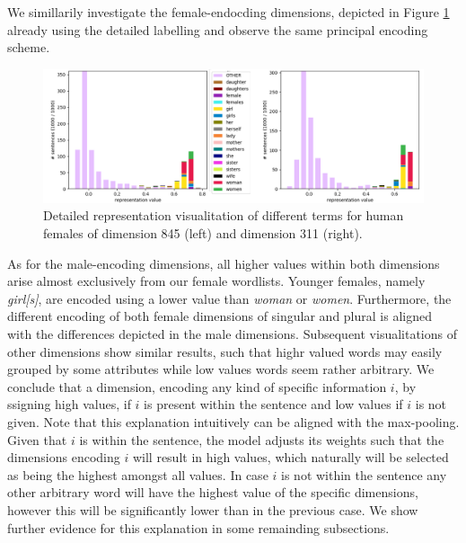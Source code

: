 \noindent
We simillarily investigate the female-endocding dimensions, depicted in Figure \ref{fig:mf_detailed_f} already using the detailed labelling and observe the same principal encoding scheme. 
\begin{figure}[tph!]
\centering
	\includegraphics[totalheight=5cm]{fig/mf_detailed_f.png}
	\caption{Detailed representation visualitation of different terms for human females of dimension 845 (left) and dimension 311 (right).}
	\label{fig:mf_detailed_f}
\end{figure}
As for the male-encoding dimensions, all higher values within both dimensions arise almost exclusively from our female wordlists. Younger females, namely \textit{girl[s]}, are encoded using a lower value than \textit{woman} or \textit{women}. Furthermore, the different encoding of both female dimensions of singular and plural is aligned with the differences depicted in the male dimensions. Subsequent visualitations of other dimensions show similar results, such that highr valued words may easily grouped by some attributes while low values words seem rather arbitrary. We conclude that a dimension, encoding any kind of specific information $i$, by ssigning high values, if $i$ is present within the sentence and low values if $i$ is not given. Note that this explanation intuitively can be aligned with the max-pooling. Given that $i$ is within the sentence, the model adjusts its weights such that the dimensions encoding $i$ will result in high values, which naturally will be selected as being the highest amongst all values. In case $i$ is not within the sentence any other arbitrary word will have the highest value of the specific dimensions, however this will be significantly lower than in the previous case. We show further evidence for this explanation in some remainding subsections.

